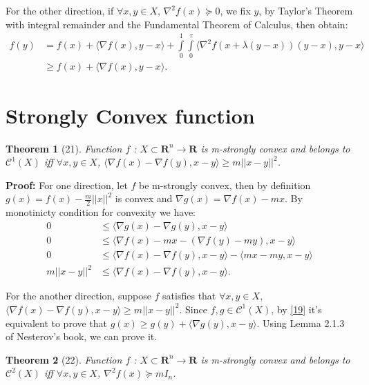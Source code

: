 \documentclass[12pt]{article}
\theoremstyle{mystyle}
\newtheorem{theorem}{Theorem}
\begin{document}
For the other direction, if $\forall x,y \in X$, $\nabla^2 f(x) \succeq 0$, we fix $y$, by Taylor's Theorem with integral remainder and the Fundamental Theorem of Calculus, then obtain:
\begin{equation*}
\begin{split}
        f(y) &= f(x) + \langle \nabla f(x) , y-x\rangle + \int\limits_0^1\int\limits_0^\tau \langle \nabla^2 f(x+ \lambda (y-x))(y-x), y-x\rangle\\
             &\geq f(x) + \langle \nabla f(x) , y-x\rangle.
\end{split}
\end{equation*}

\section{Strongly Convex function}
\begin{theorem}[21]
    Function $f$ : $X \subset \mathbf{R}^n \rightarrow \mathbf{R}$ is m-strongly convex and belongs to $\mathcal{C}^1(X)$ iff 
    $\forall x,y \in X$, $ \langle \nabla f(x) - \nabla f(y), x - y\rangle \geq m||x-y||^2$.
\end{theorem}

\textbf{Proof:} 
For one direction, let $f$ be m-strongly convex, then by definition $g(x) =  f(x) - \frac{m}{2}||x||^2$ is convex and $\nabla g(x) = \nabla f(x) - mx$. 
By monotinicty condition for convexity we have:
\begin{equation*}
\begin{split}
    0 &\leq \langle \nabla g(x) - \nabla g(y), x-y \rangle\\
    0 &\leq \langle \nabla f(x) - mx - (\nabla f(y) - my), x - y \rangle\\
    0 &\leq \langle \nabla f(x)- \nabla f(y) , x - y \rangle - \langle mx - my, x - y \rangle\\
    m||x-y||^2 &\leq \langle \nabla f(x)- \nabla f(y),x-y \rangle.
\end{split}
\end{equation*}

For the another direction, suppose $f$ satisfies that $\forall x,y \in X$, $ \langle \nabla f(x) - \nabla f(y), x - y\rangle \geq m||x-y||^2$.
Since $f, g \in \mathcal{C}^1(X)$, by \ref{19} it's equivalent to prove that $g(x) \geq g(y) + \langle \nabla g(y), x - y \rangle$.
Using Lemma 2.1.3 of Nesterov's book, we can prove it.

\begin{theorem}[22]
    Function $f$ : $X \subset \mathbf{R}^n \rightarrow \mathbf{R}$ is m-strongly convex and belongs to $\mathcal{C}^2(X)$ iff 
    $\forall x,y \in X$, $ \nabla^2 f(x) \succeq mI_n$.
\end{theorem}
\end{document}
